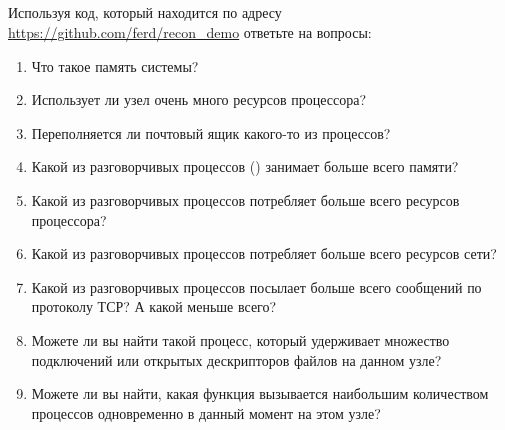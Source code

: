 \subsection*{\HandsOnTitle{}}

Используя код, который находится по адресу
\href{https://github.com/ferd/recon\_demo}{https://github.com/ferd/recon\_demo}
ответьте на вопросы:

\begin{enumerate}
	\item Что такое память системы?
	\item Использует ли узел очень много ресурсов процессора?
	\item Переполняется ли почтовый ящик какого-то из процессов?
	\item Какой из разговорчивых процессов () занимает больше всего памяти?
	\item Какой из разговорчивых процессов потребляет больше всего ресурсов процессора?
	\item Какой из разговорчивых процессов потребляет больше всего ресурсов сети?
	\item Какой из разговорчивых процессов посылает больше всего сообщений по протоколу ТСР? А какой меньше всего?
	\item Можете ли вы найти такой процесс, который удерживает множество подключений или открытых дескрипторов файлов на данном узле?
	\item Можете ли вы найти, какая функция вызывается наибольшим количеством процессов одновременно в данный момент на этом узле?
\end{enumerate}

